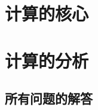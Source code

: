 \part{计算的核心}





\part{计算的分析}



\chapter*{所有问题的解答}
%    
    \begin{multicols}{2}\raggedcolumns
        \shipoutAnswer
    \end{multicols}

%
%
%

